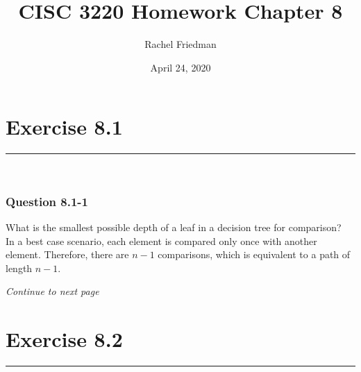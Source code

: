 \documentclass[11pt]{article}
\title{CISC 3220 Homework Chapter 8}
\author{Rachel Friedman}
\date{April 24, 2020}
\begin{document}
\maketitle

\section*{Exercise 8.1}\nointerlineskip
\noindent \rule{\linewidth}{0.01pt}\\

\subsubsection*{Question 8.1-1}\nointerlineskip

What is the smallest possible depth of a leaf in a decision tree for comparison?\\

In a best case scenario, each element is compared only once with another element. Therefore, there are $n-1$ comparisons,  which is equivalent to a path of length $n-1$.\\
\vspace{50pt}

\null\hfill
\textit{Continue to next page }\\

\newpage
\section*{Exercise 8.2}\nointerlineskip
\noindent \rule{\linewidth}{0.01pt}\\
\end{document}

